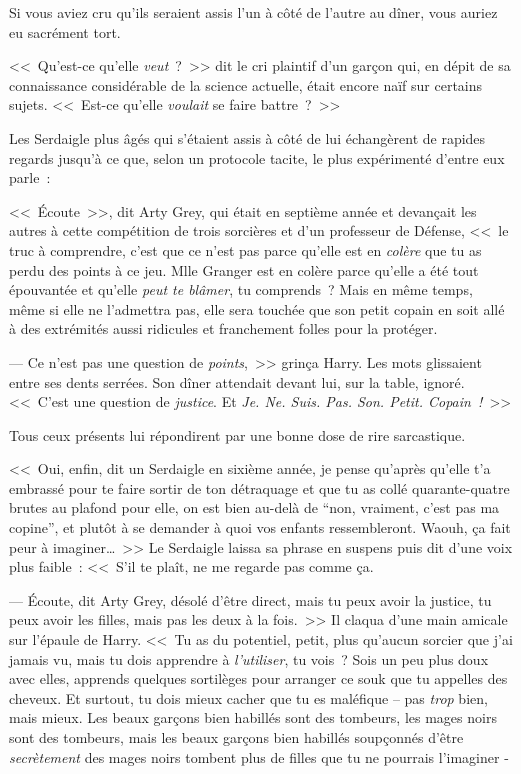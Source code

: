 \later

Si vous aviez cru qu'ils seraient assis l'un à côté de l'autre au dîner, vous auriez eu sacrément tort.

<<~Qu'est-ce qu'elle \emph{veut}~?~>> dit le cri plaintif d'un garçon qui, en dépit de sa connaissance considérable de la science actuelle, était encore naïf sur certains sujets. <<~Est-ce qu'elle \emph{voulait} se faire battre~?~>>

Les Serdaigle plus âgés qui s'étaient assis à côté de lui échangèrent de rapides regards jusqu'à ce que, selon un protocole tacite, le plus expérimenté d'entre eux parle~:

<<~Écoute~>>, dit Arty Grey, qui était en septième année et devançait les autres à cette compétition de trois sorcières et d'un professeur de Défense, <<~le truc à comprendre, c'est que ce n'est pas parce qu'elle est en \emph{colère} que tu as perdu des points à ce jeu. Mlle Granger est en colère parce qu'elle a été tout épouvantée et qu'elle \emph{peut te blâmer}, tu comprends~? Mais en même temps, même si elle ne l'admettra pas, elle sera touchée que son petit copain en soit allé à des extrémités aussi ridicules et franchement folles pour la protéger.

--- Ce n'est pas une question de \emph{points},~>> grinça Harry. Les mots glissaient entre ses dents serrées. Son dîner attendait devant lui, sur la table, ignoré. <<~C'est une question de \emph{justice}. Et \emph{Je. Ne. Suis. Pas. Son. Petit. Copain~!}~>>

Tous ceux présents lui répondirent par une bonne dose de rire sarcastique.

<<~Oui, enfin, dit un Serdaigle en sixième année, je pense qu'après qu'elle t'a embrassé pour te faire sortir de ton détraquage et que tu as collé quarante-quatre brutes au plafond pour elle, on est bien au-delà de “non, vraiment, c'est pas ma copine”, et plutôt à se demander à quoi vos enfants ressembleront. Waouh, ça fait peur à imaginer…~>> Le Serdaigle laissa sa phrase en suspens puis dit d'une voix plus faible~: <<~S'il te plaît, ne me regarde pas comme ça.

--- Écoute, dit Arty Grey, désolé d'être direct, mais tu peux avoir la justice, tu peux avoir les filles, mais pas les deux à la fois.~>> Il claqua d'une main amicale sur l'épaule de Harry. <<~Tu as du potentiel, petit, plus qu'aucun sorcier que j'ai jamais vu, mais tu dois apprendre à \emph{l'utiliser}, tu vois~? Sois un peu plus doux avec elles, apprends quelques sortilèges pour arranger ce souk que tu appelles des cheveux. Et surtout, tu dois mieux cacher que tu es maléfique -- pas \emph{trop} bien, mais mieux. Les beaux garçons bien habillés sont des tombeurs, les mages noirs sont des tombeurs, mais les beaux garçons bien habillés soupçonnés d'être \emph{secrètement} des mages noirs tombent plus de filles que tu ne pourrais l'imaginer -

